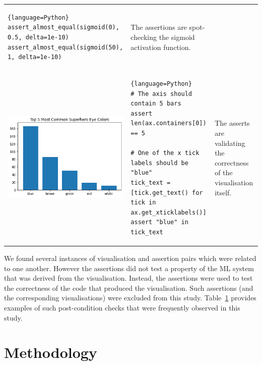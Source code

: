 \documentclass[conference]{IEEEtran}
\begin{document}
\begin{table}
\begin{tabular}{m{} m{} m{}}
\begin{lstlisting}{language=Python}
assert_almost_equal(sigmoid(0), 0.5, delta=1e-10)
assert_almost_equal(sigmoid(50), 1, delta=1e-10)
\end{lstlisting}&
The assertions are spot-checking the sigmoid activation function.\\
\includegraphics[width=\linewidth]{post-cond-03.png}&
\begin{lstlisting}{language=Python}
# The axis should contain 5 bars
assert len(ax.containers[0]) == 5

# One of the x tick labels should be "blue"
tick_text = [tick.get_text() for tick in ax.get_xticklabels()]
assert "blue" in tick_text
\end{lstlisting}&
The asserts are validating the correctness of the visualisation itself.\\
\hline
\end{tabular}
\label{tab:post-cond}
\end{table}

We found several instances of visualisation and assertion pairs which were related to one another. However the assertions did not test a property of the ML system that was derived from the visualisation. Instead, the assertions were used to test the correctness of the code that produced the visualisation. Such assertions (and the corresponding visualisations) were excluded from this study. Table~\ref{tab:post-cond} provides examples of such post-condition checks that were frequently observed in this study.

\section{Methodology}\label{sec:method}
\end{document}
